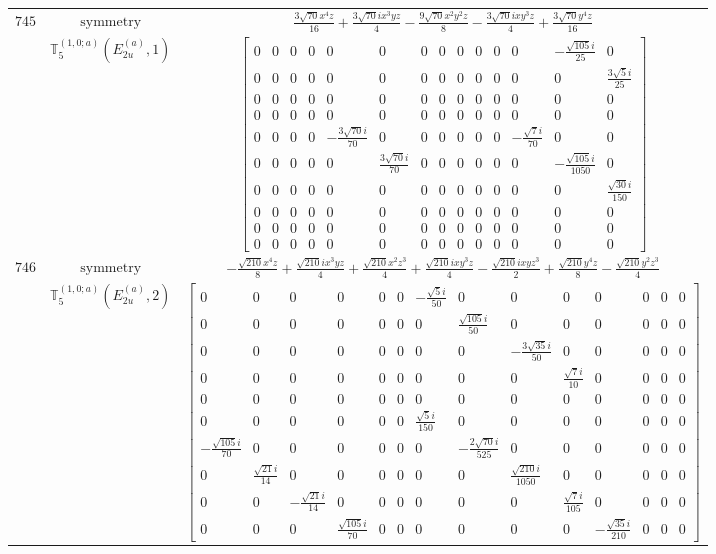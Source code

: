 \documentclass[fleqn,8pt,landscape]{jsarticle}
\begin{document}
\begin{longtable}{ccc}
$ 745 $ & $ \text{symmetry} $ & $ \frac{3 \sqrt{70} x^{4} z}{16} + \frac{3 \sqrt{70} i x^{3} y z}{4} - \frac{9 \sqrt{70} x^{2} y^{2} z}{8} - \frac{3 \sqrt{70} i x y^{3} z}{4} + \frac{3 \sqrt{70} y^{4} z}{16} $ \\
$  $ & $ \mathbb{T}_{5}^{(1,0;a)}(E_{2u}^{(a)},1) $ & $ \begin{bmatrix} 0 & 0 & 0 & 0 & 0 & 0 & 0 & 0 & 0 & 0 & 0 & 0 & - \frac{\sqrt{105} i}{25} & 0 \\ 0 & 0 & 0 & 0 & 0 & 0 & 0 & 0 & 0 & 0 & 0 & 0 & 0 & \frac{3 \sqrt{5} i}{25} \\ 0 & 0 & 0 & 0 & 0 & 0 & 0 & 0 & 0 & 0 & 0 & 0 & 0 & 0 \\ 0 & 0 & 0 & 0 & 0 & 0 & 0 & 0 & 0 & 0 & 0 & 0 & 0 & 0 \\ 0 & 0 & 0 & 0 & - \frac{3 \sqrt{70} i}{70} & 0 & 0 & 0 & 0 & 0 & 0 & - \frac{\sqrt{7} i}{70} & 0 & 0 \\ 0 & 0 & 0 & 0 & 0 & \frac{3 \sqrt{70} i}{70} & 0 & 0 & 0 & 0 & 0 & 0 & - \frac{\sqrt{105} i}{1050} & 0 \\ 0 & 0 & 0 & 0 & 0 & 0 & 0 & 0 & 0 & 0 & 0 & 0 & 0 & \frac{\sqrt{30} i}{150} \\ 0 & 0 & 0 & 0 & 0 & 0 & 0 & 0 & 0 & 0 & 0 & 0 & 0 & 0 \\ 0 & 0 & 0 & 0 & 0 & 0 & 0 & 0 & 0 & 0 & 0 & 0 & 0 & 0 \\ 0 & 0 & 0 & 0 & 0 & 0 & 0 & 0 & 0 & 0 & 0 & 0 & 0 & 0 \end{bmatrix} $ \\ \hline
$ 746 $ & $ \text{symmetry} $ & $ - \frac{\sqrt{210} x^{4} z}{8} + \frac{\sqrt{210} i x^{3} y z}{4} + \frac{\sqrt{210} x^{2} z^{3}}{4} + \frac{\sqrt{210} i x y^{3} z}{4} - \frac{\sqrt{210} i x y z^{3}}{2} + \frac{\sqrt{210} y^{4} z}{8} - \frac{\sqrt{210} y^{2} z^{3}}{4} $ \\
$  $ & $ \mathbb{T}_{5}^{(1,0;a)}(E_{2u}^{(a)},2) $ & $ \begin{bmatrix} 0 & 0 & 0 & 0 & 0 & 0 & - \frac{\sqrt{5} i}{50} & 0 & 0 & 0 & 0 & 0 & 0 & 0 \\ 0 & 0 & 0 & 0 & 0 & 0 & 0 & \frac{\sqrt{105} i}{50} & 0 & 0 & 0 & 0 & 0 & 0 \\ 0 & 0 & 0 & 0 & 0 & 0 & 0 & 0 & - \frac{3 \sqrt{35} i}{50} & 0 & 0 & 0 & 0 & 0 \\ 0 & 0 & 0 & 0 & 0 & 0 & 0 & 0 & 0 & \frac{\sqrt{7} i}{10} & 0 & 0 & 0 & 0 \\ 0 & 0 & 0 & 0 & 0 & 0 & 0 & 0 & 0 & 0 & 0 & 0 & 0 & 0 \\ 0 & 0 & 0 & 0 & 0 & 0 & \frac{\sqrt{5} i}{150} & 0 & 0 & 0 & 0 & 0 & 0 & 0 \\ - \frac{\sqrt{105} i}{70} & 0 & 0 & 0 & 0 & 0 & 0 & - \frac{2 \sqrt{70} i}{525} & 0 & 0 & 0 & 0 & 0 & 0 \\ 0 & \frac{\sqrt{21} i}{14} & 0 & 0 & 0 & 0 & 0 & 0 & \frac{\sqrt{210} i}{1050} & 0 & 0 & 0 & 0 & 0 \\ 0 & 0 & - \frac{\sqrt{21} i}{14} & 0 & 0 & 0 & 0 & 0 & 0 & \frac{\sqrt{7} i}{105} & 0 & 0 & 0 & 0 \\ 0 & 0 & 0 & \frac{\sqrt{105} i}{70} & 0 & 0 & 0 & 0 & 0 & 0 & - \frac{\sqrt{35} i}{210} & 0 & 0 & 0 \end{bmatrix} $ \\ \hline

\end{longtable}
\end{document}

